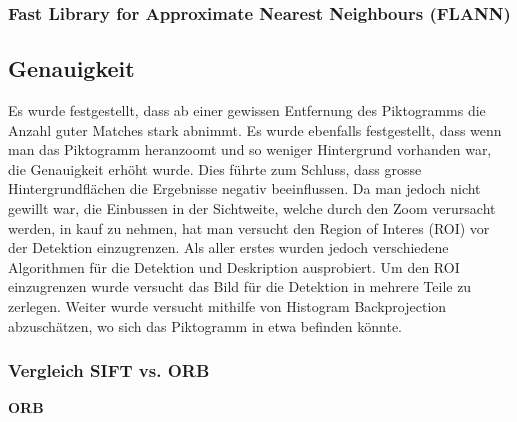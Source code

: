 \subsubsection{Fast Library for Approximate Nearest Neighbours (FLANN)}

\subsection{Genauigkeit}
Es wurde festgestellt, dass ab einer gewissen Entfernung des Piktogramms die Anzahl guter Matches stark abnimmt. Es wurde ebenfalls festgestellt, dass wenn man das Piktogramm heranzoomt und so weniger Hintergrund vorhanden war, die Genauigkeit erhöht wurde. Dies führte zum Schluss, dass grosse Hintergrundflächen die Ergebnisse negativ beeinflussen. Da man jedoch nicht gewillt war, die Einbussen in der Sichtweite, welche durch den Zoom verursacht werden, in kauf zu nehmen, hat man versucht den Region of Interes (ROI) vor der Detektion einzugrenzen. Als aller erstes wurden jedoch verschiedene Algorithmen für die Detektion und Deskription ausprobiert. Um den ROI einzugrenzen wurde versucht das Bild für die Detektion in mehrere Teile zu zerlegen. Weiter wurde versucht mithilfe von Histogram Backprojection abzuschätzen, wo sich das Piktogramm in etwa befinden könnte.

\subsubsection{Vergleich SIFT vs. ORB}
\textbf{ORB}\\

